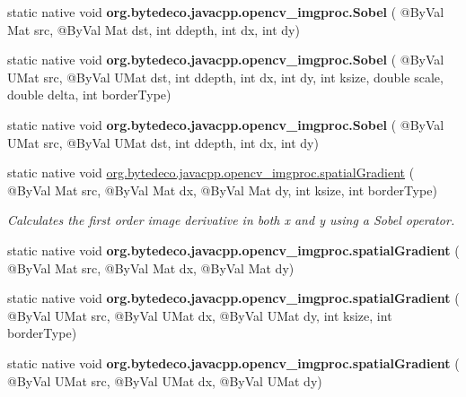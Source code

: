 \begin{DoxyCompactItemize}
\mbox{\label{group__imgproc__filter_gabccce6b56a1dddcbe6e5477e72bfdace}} 
static native void {\bfseries org.\+bytedeco.\+javacpp.\+opencv\+\_\+imgproc.\+Sobel} ( @By\+Val Mat src, @By\+Val Mat dst, int ddepth, int dx, int dy)
\item 
\mbox{\label{group__imgproc__filter_gab3caf932611ece89e8bed4dcdf598fd4}} 
static native void {\bfseries org.\+bytedeco.\+javacpp.\+opencv\+\_\+imgproc.\+Sobel} ( @By\+Val U\+Mat src, @By\+Val U\+Mat dst, int ddepth, int dx, int dy, int ksize, double scale, double delta, int border\+Type)
\item 
\mbox{\label{group__imgproc__filter_gafa284cff1dffaff09659785f42a8a389}} 
static native void {\bfseries org.\+bytedeco.\+javacpp.\+opencv\+\_\+imgproc.\+Sobel} ( @By\+Val U\+Mat src, @By\+Val U\+Mat dst, int ddepth, int dx, int dy)
\item 
static native void \hyperlink{group__imgproc__filter_ga9263e9262b1d9a29e4dc3180d4ee2683}{org.\+bytedeco.\+javacpp.\+opencv\+\_\+imgproc.\+spatial\+Gradient} ( @By\+Val Mat src, @By\+Val Mat dx, @By\+Val Mat dy, int ksize, int border\+Type)
\begin{DoxyCompactList}\small\item\em Calculates the first order image derivative in both x and y using a Sobel operator. \end{DoxyCompactList}\item 
\mbox{\label{group__imgproc__filter_gaf7fe45c6c7a7b791fe6683227e80f220}} 
static native void {\bfseries org.\+bytedeco.\+javacpp.\+opencv\+\_\+imgproc.\+spatial\+Gradient} ( @By\+Val Mat src, @By\+Val Mat dx, @By\+Val Mat dy)
\item 
\mbox{\label{group__imgproc__filter_gae2ccdf9f61018c4bf9c3dbf48f603257}} 
static native void {\bfseries org.\+bytedeco.\+javacpp.\+opencv\+\_\+imgproc.\+spatial\+Gradient} ( @By\+Val U\+Mat src, @By\+Val U\+Mat dx, @By\+Val U\+Mat dy, int ksize, int border\+Type)
\item 
\mbox{\label{group__imgproc__filter_ga87516c2f840e0444c4284be8c686971d}} 
static native void {\bfseries org.\+bytedeco.\+javacpp.\+opencv\+\_\+imgproc.\+spatial\+Gradient} ( @By\+Val U\+Mat src, @By\+Val U\+Mat dx, @By\+Val U\+Mat dy)

\end{DoxyCompactItemize}
